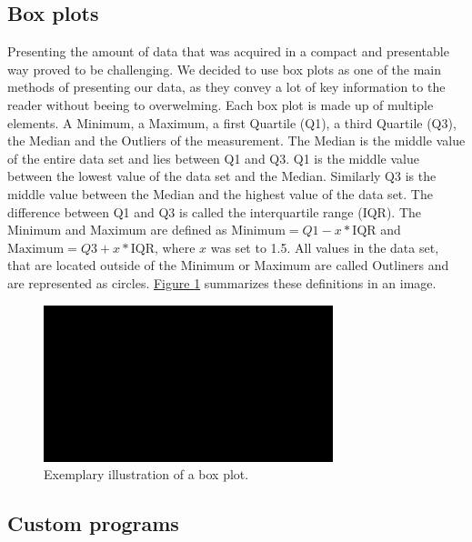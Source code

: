 \subsection{Box plots}
Presenting the amount of data that was acquired in a compact and presentable way proved to be challenging. We decided to use box plots
as one of the main methods of presenting our data, as they convey a lot of key information to the reader without beeing to overwelming.
Each box plot is made up of multiple elements. A Minimum, a Maximum, a first Quartile (Q1), a third Quartile (Q3), the Median and
the Outliers of the measurement. The Median is the middle value of the entire data set and lies between Q1 and Q3. Q1  is the middle
value between the lowest value of the data set and the Median. Similarly Q3 is the middle value between the Median and the
highest value of the data set. The difference between Q1 and Q3 is called the interquartile range (IQR). The Minimum and Maximum are
defined as $\text{Minimum} = Q1 - x*\text{IQR}$ and $\text{Maximum} = Q3 + x*\text{IQR}$, where $x$ was set to 1.5.
All values in the data set, that are located outside of the Minimum or Maximum are called Outliners and are represented as circles.
\hyperref[fig:boxplot]{Figure \ref*{fig:boxplot}} summarizes these definitions in an image.

\begin{figure}
	\begin{center}
		\includegraphics[width=0.75\textwidth]{./figures/SEIRD.png}
		\caption{Exemplary illustration of a box plot.
			}
		\label{fig:boxplot}
	\end{center}
\end{figure}


\subsection{Custom programs}

